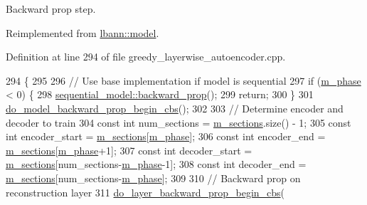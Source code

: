 Backward prop step. 

Reimplemented from \hyperlink{classlbann_1_1model_a2ce4444efaab4dd1236c837d6847e438}{lbann\+::model}.



Definition at line 294 of file greedy\+\_\+layerwise\+\_\+autoencoder.\+cpp.


\begin{DoxyCode}
294                                                  \{
295 
296   \textcolor{comment}{// Use base implementation if model is sequential}
297   \textcolor{keywordflow}{if} (\hyperlink{classlbann_1_1greedy__layerwise__autoencoder_a1baf1b5e7fdb5d006f443edbb0bb2973}{m\_phase} < 0) \{
298     \hyperlink{classlbann_1_1model_a2ce4444efaab4dd1236c837d6847e438}{sequential\_model::backward\_prop}();
299     \textcolor{keywordflow}{return};
300   \}
301   \hyperlink{classlbann_1_1model_a8a60eee343381e657b2c042637e56751}{do\_model\_backward\_prop\_begin\_cbs}();
302 
303   \textcolor{comment}{// Determine encoder and decoder to train}
304   \textcolor{keyword}{const} \textcolor{keywordtype}{int} num\_sections = \hyperlink{classlbann_1_1greedy__layerwise__autoencoder_aacb3dbf01c38f46a32927722420c5d41}{m\_sections}.size() - 1;
305   \textcolor{keyword}{const} \textcolor{keywordtype}{int} encoder\_start = \hyperlink{classlbann_1_1greedy__layerwise__autoencoder_aacb3dbf01c38f46a32927722420c5d41}{m\_sections}[\hyperlink{classlbann_1_1greedy__layerwise__autoencoder_a1baf1b5e7fdb5d006f443edbb0bb2973}{m\_phase}];
306   \textcolor{keyword}{const} \textcolor{keywordtype}{int} encoder\_end = \hyperlink{classlbann_1_1greedy__layerwise__autoencoder_aacb3dbf01c38f46a32927722420c5d41}{m\_sections}[\hyperlink{classlbann_1_1greedy__layerwise__autoencoder_a1baf1b5e7fdb5d006f443edbb0bb2973}{m\_phase}+1];
307   \textcolor{keyword}{const} \textcolor{keywordtype}{int} decoder\_start = \hyperlink{classlbann_1_1greedy__layerwise__autoencoder_aacb3dbf01c38f46a32927722420c5d41}{m\_sections}[num\_sections-\hyperlink{classlbann_1_1greedy__layerwise__autoencoder_a1baf1b5e7fdb5d006f443edbb0bb2973}{m\_phase}-1];
308   \textcolor{keyword}{const} \textcolor{keywordtype}{int} decoder\_end = \hyperlink{classlbann_1_1greedy__layerwise__autoencoder_aacb3dbf01c38f46a32927722420c5d41}{m\_sections}[num\_sections-\hyperlink{classlbann_1_1greedy__layerwise__autoencoder_a1baf1b5e7fdb5d006f443edbb0bb2973}{m\_phase}];
309 
310   \textcolor{comment}{// Backward prop on reconstruction layer}
311   \hyperlink{classlbann_1_1model_a51dc59ea8dd4bc689854732269aaf001}{do\_layer\_backward\_prop\_begin\_cbs}(

\end{DoxyCode}
